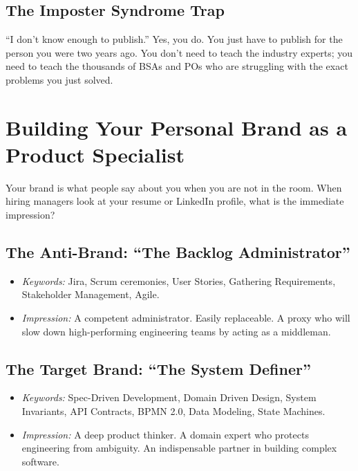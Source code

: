 \subsection{The Imposter Syndrome
Trap}\label{the-imposter-syndrome-trap}

``I don't know enough to publish.'' Yes, you do. You just have to
publish for the person you were two years ago. You don't need to teach
the industry experts; you need to teach the thousands of BSAs and POs
who are struggling with the exact problems you just solved.

\bigskip

\section{Building Your Personal Brand as a Product
Specialist}\label{building-your-personal-brand-as-a-product-specialist}

Your brand is what people say about you when you are not in the room.
When hiring managers look at your resume or LinkedIn profile, what is
the immediate impression?

\subsection{The Anti-Brand: ``The Backlog
Administrator''}\label{the-anti-brand-the-backlog-administrator}

\begin{itemize}
\tightlist
\item
  \emph{Keywords:} Jira, Scrum ceremonies, User Stories, Gathering
  Requirements, Stakeholder Management, Agile.
\item
  \emph{Impression:} A competent administrator. Easily replaceable. A
  proxy who will slow down high-performing engineering teams by acting
  as a middleman.
\end{itemize}

\subsection{The Target Brand: ``The System
Definer''}\label{the-target-brand-the-system-definer}

\begin{itemize}
\tightlist
\item
  \emph{Keywords:} Spec-Driven Development, Domain Driven Design, System
  Invariants, API Contracts, BPMN 2.0, Data Modeling, State Machines.
\item
  \emph{Impression:} A deep product thinker. A domain expert who
  protects engineering from ambiguity. An indispensable partner in
  building complex software.
\end{itemize}

